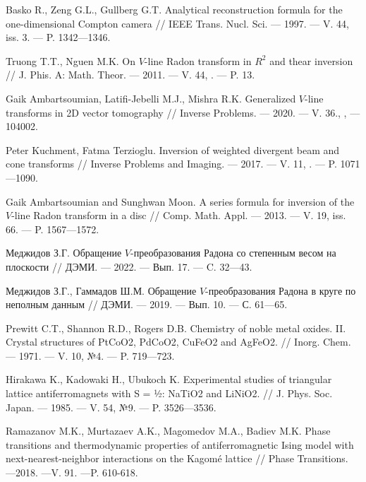 \begin{thebibliography}{99}
Basko R., Zeng G.L., Gullberg G.T.
Analytical reconstruction formula for the one-dimensional Compton camera
//
IEEE Trans. Nucl. Sci.
--- 1997.
--- V. 44, iss. 3.
--- P. 1342---1346.




Truong T.T., Nguen M.K.
On $V$-line Radon transform in $R^2$ and thear inversion
//
J. Phis. A: Math. Theor.
--- 2011.
--- V. 44, .
--- P. 13.




Gaik Ambartsoumian, Latifi-Jebelli M.J., Mishra R.K.
Generalized $V$-line transforms in 2D vector tomography
//
Inverse Problems.
--- 2020.
--- V. 36., ,
--- 104002.




Peter Kuchment, Fatma Terzioglu.
Inversion of weighted divergent beam and cone transforms
//
Inverse Problems and Imaging.
--- 2017.
--- V. 11, .
--- P. 1071---1090.





Gaik Ambartsoumian and Sunghwan Moon.
A series formula for inversion of the $V$-line Radon transform in a disc
//
Comp. Math. Appl.
--- 2013.
--- V. 19, iss. 66.
--- P. 1567---1572.




Меджидов З.Г.
Обращение $V$-преобразования Радона со степенным весом на плоскости
//
ДЭМИ.
--- 2022.
--- Вып. 17.
--- C. 32---43.




Меджидов З.Г., Гаммадов Ш.М.
Обращение $V$-преобразования Радона в круге по неполным данным
//
ДЭМИ.
--- 2019.
--- Вып. 10.
--- С. 61---65.




Prewitt C.T., Shannon R.D., Rogers D.B.
Chemistry of noble metal oxides. II. Crystal structures of PtCoO2, PdCoO2, CuFeO2 and AgFeO2.
//
Inorg. Chem.
--- 1971.
--- V. 10, №4.
--- P. 719---723.




Hirakawa K., Kadowaki H., Ubukoch K.
Experimental studies of triangular lattice antiferromagnets with S = ½: NaTiO2 and LiNiO2.
//
J. Phys. Soc. Japan.
--- 1985.
--- V. 54, №9.
--- P. 3526---3536.




Ramazanov M.K., Murtazaev A.K., Magomedov M.A., Badiev M.K.
Phase transitions and thermodynamic properties of antiferromagnetic Ising model with next-nearest-neighbor interactions on the Kagomé lattice
//
Phase Transitions. ---2018. ---V. 91. ---P. 610-618.





\end{thebibliography}
